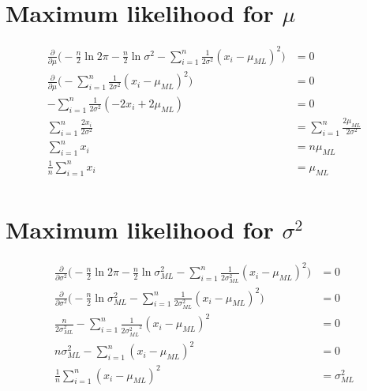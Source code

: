 \section{Maximum likelihood for $\mu$}\label{AP:mu_ML}
\begin{equation}\label{eq:ap_derivative_mu}
\begin{split}
    \frac{\partial }{\partial \mu } \big( - \frac{n}{2} \ln{2 \pi} - \frac{n}{2} \ln{\sigma ^2} - \sum_{i=1}^{n} \frac{1}{2\sigma ^2}(x_i - \mu_{ML})^2 \big) &= 0\\
    \frac{\partial}{\partial \mu} \big( - \sum_{i=1}^{n} \frac{1}{2\sigma ^2}(x_i - \mu_{ML})^2 \big) &= 0\\
    - \sum_{i=1}^{n} \frac{1}{2\sigma ^2}(-2 x_i + 2 \mu_{ML}) &= 0\\
    \sum_{i=1}^{n} \frac{2 x_i}{2\sigma ^2} &= \sum_{i=1}^{n} \frac{2 \mu_{ML}}{2\sigma ^2}\\
    \sum_{i=1}^{n} x_i &= n \mu_{ML}\\
    \frac{1}{n} \sum_{i=1}^{n} x_i &= \mu_{ML}\\
\end{split}
\end{equation}

\section{Maximum likelihood for $\sigma^2$}\label{AP:s2_ML}

\begin{equation}\label{eq:ap_derivative_sigma}
\begin{split}
    \frac{\partial }{\partial \sigma^2 } \big( - \frac{n}{2} \ln{2 \pi} - \frac{n}{2} \ln{\sigma^2_{ML}} - \sum_{i=1}^{n} \frac{1}{2\sigma^2_{ML}}(x_i - \mu_{ML})^2 \big) &= 0\\
    \frac{\partial}{\partial \sigma^2} \big( - \frac{n}{2} \ln{\sigma^2_{ML}}  - \sum_{i=1}^{n} \frac{1}{2\sigma^2_{ML}}(x_i - \mu_{ML})^2 \big) &= 0\\
    \frac{n}{2\sigma^2_{ML}} - \sum_{i=1}^{n} \frac{1}{2{\sigma^2_{ML}}^2}(x_i - \mu_{ML})^2 &= 0\\
    n\sigma^2_{ML} - \sum_{i=1}^{n} (x_i - \mu_{ML})^2 &= 0\\
    \frac{1}{n} \sum_{i=1}^{n} (x_i - \mu_{ML})^2 &= \sigma^2_{ML}\\
\end{split}
\end{equation}

\newpage

